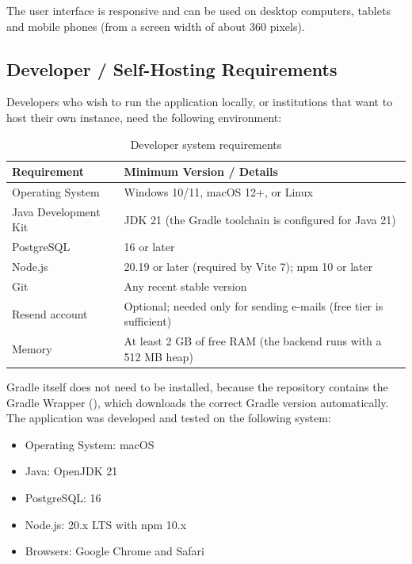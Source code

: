 The user interface is responsive and can be used on desktop computers, tablets and
mobile phones (from a screen width of about 360 pixels).

\subsection{Developer / Self-Hosting Requirements}

Developers who wish to run the application locally, or institutions that want to host
their own instance, need the following environment:

\begin{table}[H]
  \centering
  \small
  \begin{tabularx}{\textwidth}{@{}l X@{}}
    \toprule
    \textbf{Requirement} & \textbf{Minimum Version / Details} \\
    \midrule
    Operating System & Windows 10/11, macOS 12+, or Linux \\
    Java Development Kit & JDK 21 (the Gradle toolchain is configured for Java 21) \\
    PostgreSQL & 16 or later \\
    Node.js & 20.19 or later (required by Vite 7); npm 10 or later \\
    Git & Any recent stable version \\
    Resend account & Optional; needed only for sending e-mails (free tier is sufficient)~\cite{resend} \\
    Memory & At least 2 GB of free RAM (the backend runs with a 512 MB heap) \\
    \bottomrule
  \end{tabularx}
  \caption{Developer system requirements}
  \label{tab:dev-req}
\end{table}

Gradle itself does not need to be installed, because the repository contains the
Gradle Wrapper (), which downloads the correct Gradle version
automatically. The application was developed and tested on the following system:

\begin{itemize}
  \item Operating System: macOS
  \item Java: OpenJDK 21
  \item PostgreSQL: 16
  \item Node.js: 20.x LTS with npm 10.x
  \item Browsers: Google Chrome and Safari
\end{itemize}

